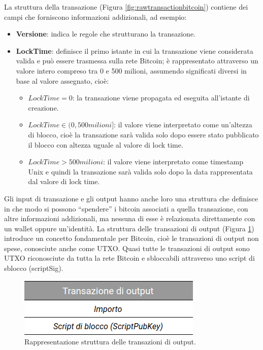 La struttura della transazione (Figura \ref{fig:rawtransactionbitcoin}) contiene dei campi che forniscono informazioni addizionali, ad esempio:
\begin{itemize}
  \item {\bf Versione\/}: indica le regole che strutturano la transazione.
  \item {\bf LockTime\/}: definisce il primo istante in cui la transazione viene considerata valida e può essere trasmessa sulla rete Bitcoin; è rappresentato attraverso un valore intero compreso tra 0 e 500 milioni, assumendo  significati diversi in base al valore assegnato, cioè:
  \begin{itemize}
    \item \(LockTime = 0 \): la transazione viene propagata ed eseguita all’istante di creazione.
    \item \( LockTime \in (0, 500 milioni] \): il valore viene interpretato come un’altezza di blocco, cioè la transazione sarà valida solo dopo essere stato pubblicato il blocco con altezza uguale al valore di lock time.
    \item \(LockTime > 500 milioni \): il valore viene interpretato come timestamp Unix e quindi la transazione sarà valida solo dopo la data rappresentata dal valore di lock time.
  \end{itemize}
\end{itemize}

Gli input di transazione e gli output hanno anche loro una struttura che definisce in che modo si possono “spendere” i bitcoin associati a quella transazione, con altre informazioni addizionali, ma nessuna di esse è relazionata direttamente con un wallet oppure un’identità.
La struttura delle transazioni di output (Figura \ref{fig:outputtransaztionbitcoin}) introduce un concetto fondamentale per Bitcoin, cioè le transazioni di output non spese, conosciute anche come UTXO.
Quasi tutte le transazioni di output sono UTXO riconosciute da tutta la rete Bitcoin e sbloccabili attraverso uno script di sblocco (scriptSig).

\begin{figure}[H]
\begin{center}
\includegraphics[width=0.6\columnwidth]{images/output-transactions-bitcoin.png}
\end{center}
\caption{Rappresentazione struttura delle transazioni di output.}
\label{fig:outputtransaztionbitcoin}
\end{figure}

